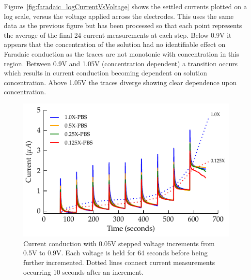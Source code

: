 \documentclass[journal, a4paper]{IEEEtran}
\begin{document}
Figure~\ref{fig:faradaic_logCurrentVsVoltage} shows the settled currents plotted on a log scale, versus the voltage applied across the electrodes. This uses the same data as the previous figure but has been processed so that each point represents the average of the final 24 current measurements at each step. Below 0.9\thinspace V it appears that the concentration of the solution had no identifiable effect on Faradaic conduction as the traces are not monotonic with concentration in this region.  Between 0.9\thinspace V and 1.05\thinspace V (concentration dependent) a transition occurs which results in current conduction becoming dependent on solution concentration.
Above 1.05\thinspace V the traces diverge showing clear dependence upon concentration.

\begin{figure}
    \begin{center}
        \includegraphics{graphics/currentTimeFaradaicCPE_Stacked_IEEE}
    \end{center}
    \caption{Current conduction with 0.05\thinspace V stepped voltage increments from 0.5\thinspace V to 0.9V. Each voltage is held for 64 seconds before being further incremented. Dotted lines connect current measurements occurring 10 seconds after an increment.}
    \label{fig:StepResponse_Faradaic}
\end{figure}
\end{document}
